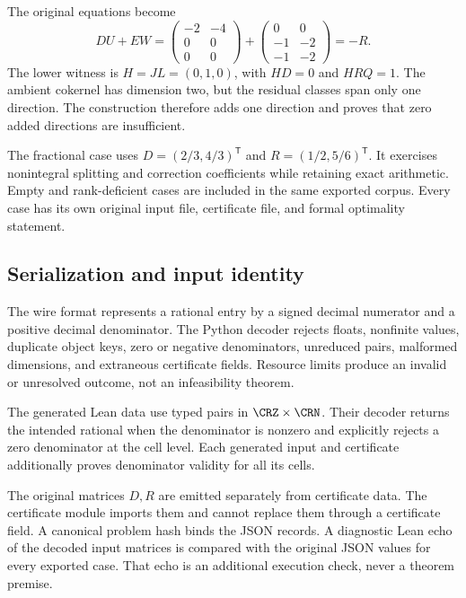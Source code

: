 The original equations become
\[
 DU+EW=
 \begin{pmatrix}-2&-4\\0&0\\0&0\end{pmatrix}+
 \begin{pmatrix}0&0\\-1&-2\\-1&-2\end{pmatrix}=-R.
\]
The lower witness is $H=JL=(0,1,0)$, with $HD=0$ and $HRQ=1$. The ambient cokernel has dimension two, but the residual classes span only one direction. The construction therefore adds one direction and proves that zero added directions are insufficient.

The fractional case uses $D=(2/3,4/3)^{\mathsf T}$ and $R=(1/2,5/6)^{\mathsf T}$. It exercises nonintegral splitting and correction coefficients while retaining exact arithmetic. Empty and rank-deficient cases are included in the same exported corpus. Every case has its own original input file, certificate file, and formal optimality statement.

\subsection{Serialization and input identity}
The wire format represents a rational entry by a signed decimal numerator and a positive decimal denominator. The Python decoder rejects floats, nonfinite values, duplicate object keys, zero or negative denominators, unreduced pairs, malformed dimensions, and extraneous certificate fields. Resource limits produce an invalid or unresolved outcome, not an infeasibility theorem.

The generated Lean data use typed pairs in $\CRZ\times\CRN$. Their decoder returns the intended rational when the denominator is nonzero and explicitly rejects a zero denominator at the cell level. Each generated input and certificate additionally proves denominator validity for all its cells.

The original matrices $D,R$ are emitted separately from certificate data. The certificate module imports them and cannot replace them through a certificate field. A canonical problem hash binds the JSON records. A diagnostic Lean echo of the decoded input matrices is compared with the original JSON values for every exported case. That echo is an additional execution check, never a theorem premise.

